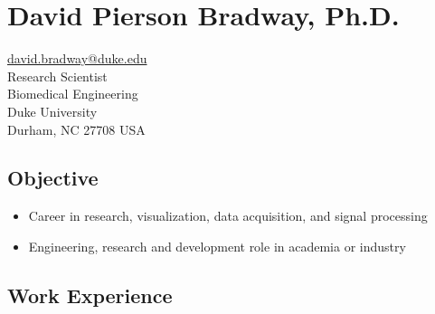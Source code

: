 \documentclass[]{article}
\author{}
\date{}
\begin{document}
\section{David Pierson Bradway,
Ph.D.}\label{david-pierson-bradway-ph.d.}

\href{mailto:david.bradway@duke.edu}{david.bradway@duke.edu}\\Research
Scientist\\Biomedical Engineering\\Duke University\\Durham, NC 27708 USA

\subsection{Objective}\label{objective}

\begin{itemize}
\itemsep1pt\parskip0pt
\item
  Career in research, visualization, data acquisition, and signal
  processing
\item
  Engineering, research and development role in academia or industry
\end{itemize}

\subsection{Work Experience}\label{work-experience}
\end{document}
